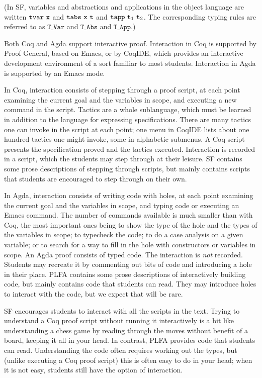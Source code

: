 \documentclass[preprint,authoryear]{elsarticle}
\begin{document}
(In SF, variables and abstractions and applications in
the object language are written $\texttt{tvar}~\texttt{x}$ and
$\texttt{tabs}~\texttt{x}~\texttt{t}$ and $\texttt{tapp}~\texttt{t}_1~\texttt{t}_2$.
The corresponding typing rules are referred to as
$\texttt{T\_Var}$ and $\texttt{T\_Abs}$ and $\texttt{T\_App}$.)

Both Coq and Agda support interactive proof.  Interaction in Coq is
supported by Proof General, based on Emacs, or by CoqIDE, which
provides an interactive development environment of a sort familiar to
most students.  Interaction in Agda is supported by an Emacs mode.

In Coq, interaction consists of stepping through a proof script, at
each point examining the current goal and the variables in
scope, and executing a new command in the script.  Tactics are a whole
sublanguage, which must be learned in addition to the language for
expressing specifications.  There are many tactics one can invoke in
the script at each point; one menu in CoqIDE lists about one hundred
tactics one might invoke, some in alphabetic submenus.  A Coq
script presents the specification proved and the tactics executed.
Interaction is recorded in a script, which the students
may step through at their leisure.  SF contains some prose descriptions
of stepping through scripts, but mainly contains scripts that students
are encouraged to step through on their own.

In Agda, interaction consists of writing code with holes, at each
point examining the current goal and the variables in scope, and
typing code or executing an Emacs command.  The number of commands
available is much smaller than with Coq, the most important ones being
to show the type of the hole and the types of the variables in scope;
to typecheck the code; to do a case analysis on a given variable; or to
search for a way to fill in the hole with constructors or variables in scope.
An Agda proof consists of typed code.  The interaction is \emph{not}
recorded.  Students may recreate it by commenting out bits of code and
introducing a hole in their place.   PLFA contains some prose descriptions
of interactively building code, but mainly contains code that students
can read.  They may introduce holes to interact with the code, but
we expect that will be rare.

SF encourages students to interact with all the scripts in the text.
Trying to understand a Coq proof script without running it
interactively is a bit like understanding a chess game by reading
through the moves without benefit of a board, keeping it all in your
head.  In contrast, PLFA provides code that students can read.
Understanding the code often requires working out the types, but
(unlike executing a Coq proof script) this is often easy to do in your
head; when it is not easy, students still have the option of
interaction.
\end{document}
